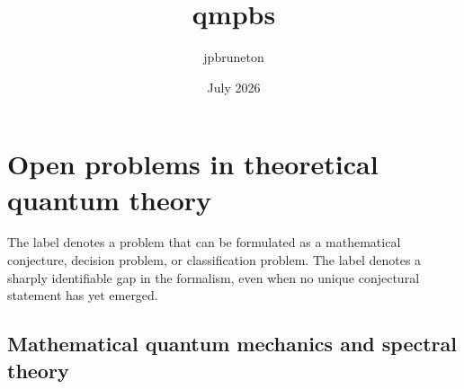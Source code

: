 \documentclass{article}
\title{qmpbs}
\author{jpbruneton }
\date{July 2026}
\begin{document}
\maketitle

%

\section{Open problems in theoretical quantum theory}

The label \precise{} denotes a problem that can be formulated as a
mathematical conjecture, decision problem, or classification problem.
The label \formalism{} denotes a sharply identifiable gap in the
formalism, even when no unique conjectural statement has yet emerged.

\subsection{Mathematical quantum mechanics and spectral theory}
\end{document}
